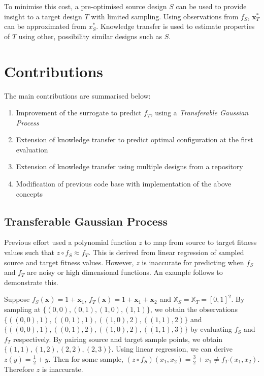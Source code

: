 \documentclass[10pt,a4paper]{article}
\begin{document}
To minimise this cost, a pre-optimised source design $S$ can be used to provide insight to a target design $T$ with limited sampling. Using observations from $f_S$, $\mathbf{x}_T^*$ can be approximated from $x_S^*$. Knowledge transfer is used to estimate properties of $T$ using other, possibility similar designs such as $S$.

\section{Contributions}

The main contributions are summarised below:
\begin{enumerate}
\item Improvement of the surrogate to predict $f_T$, using a \emph{Transferable Gaussian Process}
\item Extension of knowledge transfer to predict optimal configuration at the first evaluation
\item Extension of knowledge transfer using multiple designs from a repository
\item Modification of previous code base\cite{Nicholson2015} with implementation of the above concepts
\end{enumerate}
\subsection{Transferable Gaussian Process}

Previous effort\cite{Kurek2016} used a polynomial function $z$ to map from source to target fitness values such that $z\circ f_S\approx f_T$. This is derived from linear regression of sampled source and target fitness values. However, $z$ is inaccurate for predicting when $f_S$ and $f_T$ are noisy or high dimensional functions. An example follows to demonstrate this.

Suppose $f_S(\mathbf{x})=1+\mathbf{x}_1$, $f_T(\mathbf{x})=1+\mathbf{x}_1+\mathbf{x}_2$ and $\mathbb{X}_S=\mathbb{X}_T=[0,1]^2$. By sampling at $\{(0,0),(0,1),(1,0),(1,1)\}$, we obtain the observations $\{((0,0),1),\allowbreak((0,1),1),((1,0),2),((1,1),2)\}$ and $\{((0,0),1),((0,1),2),((1,0),2),((1,1),3)\}$ by evaluating $f_S$ and $f_T$ respectively. By pairing source and target sample points, we obtain $\{(1,1),(1,2),(2,2),(2,3)\}$. Using linear regression, we can derive $z(y)=\frac{1}{2}+y$. Then for some sample, $(z\circ f_S)(x_1,x_2)=\frac{3}{2}+x_1\not=f_T(x_1,x_2)$. Therefore $z$ is inaccurate.
\end{document}
